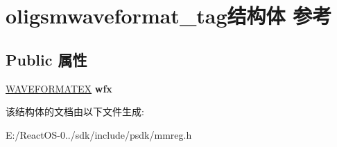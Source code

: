 \hypertarget{structoligsmwaveformat__tag}{}\section{oligsmwaveformat\+\_\+tag结构体 参考}
\label{structoligsmwaveformat__tag}
\subsection*{Public 属性}
\begin{DoxyCompactItemize}
\item 
\mbox{\label{structoligsmwaveformat__tag_aa54c5e534630830165898905b2697f7b}} 
\hyperlink{struct_w_a_v_e_f_o_r_m_a_t_e_x}{W\+A\+V\+E\+F\+O\+R\+M\+A\+T\+EX} {\bfseries wfx}
\end{DoxyCompactItemize}


该结构体的文档由以下文件生成\+:\begin{DoxyCompactItemize}
\item 
E\+:/\+React\+O\+S-\/0../sdk/include/psdk/mmreg.\+h\end{DoxyCompactItemize}
